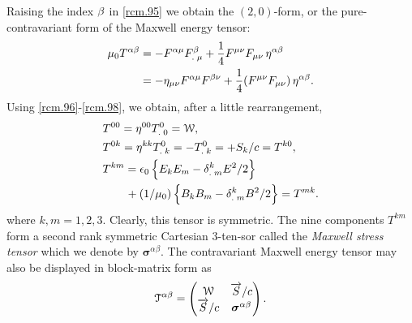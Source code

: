 Raising the index $\gkb$ in \eqref{rcm.95} we obtain  the
$(2,0)$-form, or the pure-contravariant form of the
Maxwell energy  tensor:
\begin{align}\label{rcm.102}
\muo T^{\gka\gkb}&=-F^{\gka\gkm}\mtud{F}{\gkb}{\gkm}
+\frac{1}{4}F^ {\gkm\gkn} F_{\gkm\gkn}
\,\gky^{\gka\gkb}\notag\\
&=-\gky_{\gkm\gkn}F^{\gka\gkm}F^{\gkb\gkn}
+\frac{1}{4}(F^ {\gkm\gkn} F_{\gkm\gkn})
\,\gky^{\gka\gkb}.
\end{align}
Using \eqref{rcm.96}-\eqref{rcm.98}, we obtain, after a 
little rearrangement,
\begin{align}\label{rcm.103}
&T^{00}=\gky^{00}\mtud{T}{0}{0}=\EuScript{W}\notag,\\
&T^{0k}=\gky^{kk}\mtud{T}{0}{k}=-\mtud{T}{0}{k}=
+S_k/c= T^{k 0},\notag \\
&T^{km}= \epso\left\lbrace E_k E_m
-\mtud{\delta}{k}{m} E^2/2\right \rbrace \notag\\
&\qquad +(1/\muo)\left\lbrace
B_k B_m -\mtud{\delta}{k} {m} B^2/2\right\rbrace=T^{mk}.
\end{align}
where $k,m=1,2,3$. Clearly, this tensor is symmetric. The 
nine components $T^{km}$ form a second rank symmetric 
Cartesian 3-ten-\break sor called the \textsl{Maxwell stress 
tensor} 
which we denote by $\boldsymbol{\sigma}^{\alpha \beta}$. 
The 
contravariant Maxwell energy tensor may also be displayed 
in 
block-matrix form as
\begin{align}\label{rcm.104}
\EuScript{T}^{\alpha \beta}
=\begin{pmatrix}
\EuScript{W} & \vec{S}/c\\
\vec{S}/c&\boldsymbol{\sigma}^{\alpha \beta}
\end{pmatrix}.
\end{align}

